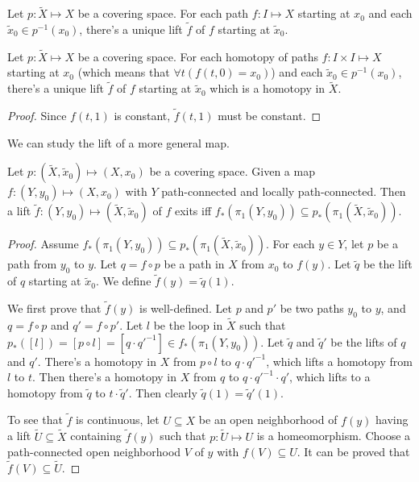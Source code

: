 \documentclass[12pt]{book}
\begin{document}
\begin{corollary}
	Let $p:\tilde X\mapsto X$ be a covering space. For each path $f:I\mapsto X$ starting at $x_0$ and each $\tilde x_0\in p^{-1}(x_0)$, there's a unique lift $\tilde f$ of $f$ starting at $\tilde x_0$. 
\end{corollary}

\begin{corollary}
	Let $p:\tilde X\mapsto X$ be a covering space. For each homotopy of paths $f:I\times I\mapsto X$ starting at $x_0$ (which means that $\forall t(f(t,0)=x_0)$) and each $\tilde x_0\in p^{-1}(x_0)$, there's a unique lift $\tilde f$ of $f$ starting at $\tilde x_0$ which is a homotopy in $\tilde X$. 
\end{corollary}
\begin{proof}
	Since $f(t,1)$ is constant, $\tilde f(t,1)$ must be constant.
\end{proof}

We can study the lift of a more general map. 
\begin{lemma}
	Let $p:(\tilde X,\tilde x_0)\mapsto (X,x_0)$ be a covering space. Given a map $f:(Y,y_0)\mapsto (X,x_0)$ with $Y$ path-connected and locally path-connected. Then a lift $\tilde f:(Y,y_0)\mapsto (\tilde X,\tilde x_0)$ of $f$ exits iff $f_*(\pi_1(Y,y_0))\subseteq p_*(\pi_1(\tilde X,\tilde x_0))$.

\end{lemma}
\begin{proof}
	Assume $f_*(\pi_1(Y,y_0))\subseteq p_*(\pi_1(\tilde X,\tilde x_0))$. For each $y\in Y$, let $p$ be a path from $y_0$ to $y$. Let $q=f\circ p$ be a path in $X$ from $x_0$ to $f(y)$. Let $\tilde q$ be the lift of $q$ starting at $\tilde x_0$. We define $\tilde f(y)=\tilde q(1)$.
	
	We first prove that $\tilde f(y)$ is well-defined. Let $p$ and $p'$ be two paths $y_0$ to $y$, and $q=f\circ p$ and $q'=f\circ p'$. Let $l$ be the loop in $\tilde X$ such that $p_*([l])=[p\circ l]=[q\cdot q'^{-1}]\in f_*(\pi_1(Y,y_0))$. Let $\tilde q$ and $\tilde q'$ be the lifts of $q$ and $q'$. There's a homotopy in $X$ from $p\circ l$ to $q\cdot q'^{-1}$, which lifts a homotopy from $l$ to $t$. Then there's a homotopy in $X$ from $q$ to $q\cdot q'^{-1}\cdot q'$, which lifts to a homotopy from $\tilde q$ to $t\cdot \tilde q'$. Then clearly $\tilde q(1)=\tilde q'(1)$.
	
	To see that $\tilde f$ is continuous, let $U\subseteq X$ be an open neighborhood of $f(y)$ having a lift $\tilde U\subseteq \tilde X$ containing $\tilde f(y)$ such that $p: \tilde U\mapsto U$ is a homeomorphism. Choose a path-connected open neighborhood $V$ of $y$ with $f(V)\subseteq U$. It can be proved that $\tilde f(V)\subseteq \tilde U$.
\end{proof}
\end{document}
